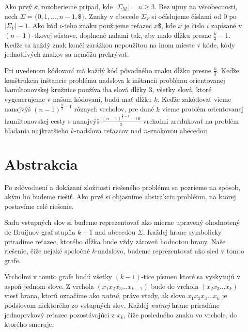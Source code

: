 Ako prvý si rozoberieme prípad, kde $|\Sigma_M| = n \ge 3$. Bez ujmy na všeobecnosti,
nech $\Sigma = \{0, 1, \ldots, n-1, \$ \}$. Znaky v abecede $\Sigma_V$ si očíslujeme
číslami od $0$ po $|\Sigma_V| - 1$. Ako kód $i$-teho znaku použijeme reťazec
$x \$ $, kde $x$ je číslo $i$ zapísané v $(n-1)$-tkovej sústave, doplnené nulami tak,
aby malo dĺžku presne $\frac{k}{3} - 1$. Keďže sa každý znak končí zarážkou nepoužitou na
inom mieste v kóde, kódy jednotlivých znakov sa nemôžu prekrývať.

Pri uvedenom kódovaní má každý kód pôvodného znaku dĺžku presne $\frac{k}{3}$. Keďže
konštrukcia inštancie problému nadslova k inštancii problému orientovanej hamiltonovskej
kružnice používa iba slová dĺžky $3$, všetky slová, ktoré vygenerujeme v našom kódovaní,
budú mať dĺžku $k$. Keďže zakódovať vieme nanajvýš $(n-1)^{\frac{k}{3} - 1}$ rôznych
vrcholov, pre dané $k$ vieme problém orientovanej hamiltonovskej cesty s nanajvýš
$\frac{(n-1)^{\frac{k}{3}-1} - 10}{2}$ vrcholmi zredukovať na problém hľadania
najkratšieho $k$-nadslova reťazcov nad $n$-znakovou abecedou.

\section{Abstrakcia}

Po zdôvodnení a dokázaní zložitosti riešeného problému sa pozrieme na spôsob, akým ho budeme
riešiť. Ako prvé si objasníme abstrakciu problému, na ktorej postavíme celé riešenie.

Sadu vstupných slov si budeme reprezentovať ako mierne upravený ohodnotený de Bruijnov graf stupňa $k - 1$ nad
abecedou $\Sigma$. Každej hrane symbolicky priradíme reťazec, ktorého dĺžka bude
vždy zároveň hodnotou hrany.
Naše riešenie, čiže nejaké spoločné $k$-nadslovo, budeme reprezentovať ako sled v tomto grafe.

Vrcholmi v tomto grafe budú všetky $(k - 1)$-tice písmen ktoré sa vyskytujú v aspoň jednom slove.
Z vrchola $\left(x_1 x_2 x_3 \ldots x_{k-1}\right)$ bude do vrchola $\left(x_2 x_3 \ldots x_k\right)$
viesť hrana, ktorú označíme ako \emph{nutnú},
práve vtedy, ak slovo $x_1 x_2 x_3 \ldots x_k$ je podslovom niektorého zo
vstupných slov. Každej \emph{nutnej} hrane priradíme jednoprvkový reťazec pozostávajúci z $x_k$, čiže
posledného znaku vo vrchole, do ktorého smeruje.

